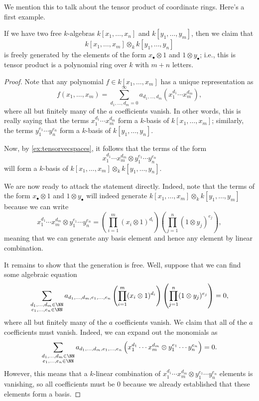 We mention this to talk about the tensor product of coordinate rings. Here's a first example.
\begin{exe} \label{exe:basictensorcoordinate}
	If we have two free $k$-algebras $k[x_1,\ldots,x_n]$ and $k[y_1,\ldots,y_m]$, then we claim that
	\[k[x_1,\ldots,x_m]\otimes_kk[y_1,\ldots,y_n]\]
	is freely generated by the elements of the form $x_\bullet\otimes1$ and $1\otimes y_\bullet$; i.e., this is tensor product is a polynomial ring over $k$ with $m+n$ letters.
\end{exe}
\begin{proof}
	Note that any polynomial $f\in k[x_1,\ldots,x_m]$ has a unique representation as
	\[f(x_1,\ldots,x_m)=\sum_{d_1,\ldots,d_m=0}^\infty a_{d_1,\ldots,d_m}\left(x_1^{d_1}\cdots x_m^{d_m}\right),\]
	where all but finitely many of the $a$ coefficients vanish. In other words, this is really saying that the terms $x_1^{d_1}\cdots x_m^{d_m}$ form a $k$-basis of $k[x_1,\ldots,x_m]$; similarly, the terms $y_1^{e_1}\cdots y_n^{e_n}$ form a $k$-basis of $k[y_1,\ldots,y_n]$.

	Now, by \autoref{ex:tensorvecspaces}, it follows that the terms of the form
	\[x_1^{d_1}\cdots x_m^{d_m}\otimes y_1^{e_1}\cdots y_n^{e_n}\]
	will form a $k$-basis of $k[x_1,\ldots,x_m]\otimes_kk[y_1,\ldots,y_n]$.

	We are now ready to attack the statement directly. Indeed, note that the terms of the form $x_\bullet\otimes1$ and $1\otimes y_\bullet$ will indeed generate $k[x_1,\ldots,x_m]\otimes_kk[y_1,\ldots,y_m]$ because we can write
	\[x_1^{d_1}\cdots x_m^{d_m}\otimes y_1^{e_1}\cdots y_n^{e_n}=\left(\prod_{i=1}^m(x_i\otimes1)^{d_i}\right)\left(\prod_{j=1}^n(1\otimes y_j)^{e_j}\right),\]
	meaning that we can generate any basis element and hence any element by linear combination.

	It remains to show that the generation is free. Well, suppose that we can find some algebraic equation
	\[\sum_{\substack{d_1,\ldots,d_m\in\NN\\e_1,\ldots,e_n\in\NN}}a_{d_1,\ldots,d_m,e_1,\ldots,e_n}\left(\prod_{i=1}^m(x_i\otimes1)^{d_i}\right)\left(\prod_{j=1}^n(1\otimes y_j)^{e_j}\right)=0,\]
	where all but finitely many of the $a$ coefficients vanish. We claim that all of the $a$ coefficients must vanish. Indeed, we can expand out the monomials as
	\[\sum_{\substack{d_1,\ldots,d_m\in\NN\\e_1,\ldots,e_n\in\NN}}a_{d_1,\ldots,d_m,e_1,\ldots,e_n}\left(x_1^{d_1}\cdots x_m^{d_m}\otimes y_1^{e_1}\cdots y_n^{e_n}\right)=0.\]
	However, this means that a $k$-linear combination of $x_1^{d_1}\cdots x_m^{d_m}\otimes y_1^{e_1}\cdots y_n^{e_n}$ elements is vanishing, so all coefficients must be $0$ because we already established that these elements form a basis.
\end{proof}
